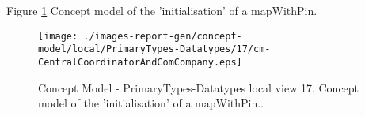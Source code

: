 Figure \ref{fig:lu.uni.lassy.excalibur.group09.spec-CM-view-local-PrimaryTypes-Datatypes-17} Concept model of the 'initialisation' of a mapWithPin.



\begin{figure}[htbp] 
\label{fig:lu.uni.lassy.excalibur.group09.spec-CM}
\begin{center}
\texttt{[image: ./images-report-gen/concept-model/local/PrimaryTypes-Datatypes/17/cm-CentralCoordinatorAndComCompany.eps]}
\end{center}
\caption[Concept Model - PrimaryTypes-Datatypes local view 17 - Concept model of the 'initialisation]{Concept Model - PrimaryTypes-Datatypes local view 17. Concept model of the 'initialisation' of a mapWithPin..}
\label{fig:lu.uni.lassy.excalibur.group09.spec-CM-view-local-PrimaryTypes-Datatypes-17}
\end{figure}
\vspace{0.5cm} 
